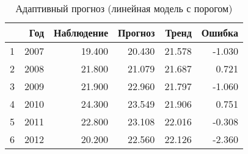 \begin{table}[ht]
\centering
\begin{tabular}{rrrrrr}
  \hline
 & Год & Наблюдение & Прогноз & Тренд & Ошибка \\ 
  \hline
1 & 2007 & 19.400 & 20.430 & 21.578 & -1.030 \\ 
  2 & 2008 & 21.800 & 21.079 & 21.687 & 0.721 \\ 
  3 & 2009 & 21.900 & 22.960 & 21.797 & -1.060 \\ 
  4 & 2010 & 24.300 & 23.549 & 21.906 & 0.751 \\ 
  5 & 2011 & 22.800 & 23.108 & 22.016 & -0.308 \\ 
  6 & 2012 & 20.200 & 22.560 & 22.126 & -2.360 \\ 
   \hline
\end{tabular}
\caption{Адаптивный прогноз (линейная модель с порогом)} 
\label{table:lin-fit-adapt-prediction}
\end{table}
